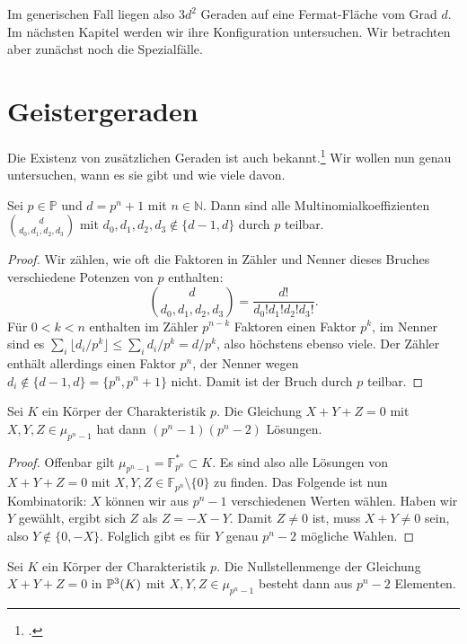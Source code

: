Im generischen Fall liegen also $3d^2$ Geraden auf eine Fermat-Fläche vom Grad $d$. Im nächsten Kapitel werden wir ihre Konfiguration untersuchen. Wir betrachten aber zunächst noch die Spezialfälle.

\section{Geistergeraden}
Die Existenz von zusätzlichen Geraden ist auch bekannt.\footcite[siehe][S.~14f]{LinesOnFermat} Wir wollen nun genau untersuchen, wann es sie gibt und wie viele davon.
\begin{prop}
Sei $p \in \mathbb P$ und $d = p^n+1$ mit $n \in \mathbb N$. Dann sind alle Multinomialkoeffizienten $\binom d{d_0,d_1,d_2,d_3}$ mit $d_0, d_1, d_2, d_3 \not\in \{d-1, d\}$ durch $p$ teilbar.
\end{prop}
\begin{proof}
Wir zählen, wie oft die Faktoren in Zähler und Nenner dieses Bruches verschiedene Potenzen von $p$ enthalten:
\begin{equation*}
\binom d{d_0,d_1,d_2,d_3} = \frac{d!}{d_0! d_1! d_2! d_3!}.
\end{equation*}
Für $0 < k < n$ enthalten im Zähler $p^{n-k}$ Faktoren einen Faktor $p^k$, im Nenner sind es $\sum_i \lfloor d_i/p^k \rfloor \leq \sum_i d_i/p^k = d/p^k$, also höchstens ebenso viele. Der Zähler enthält allerdings einen Faktor $p^n$, der Nenner wegen $d_i \not\in \{d-1, d\} = \{p^n, p^n+1\}$ nicht. Damit ist der Bruch durch $p$ teilbar.
\end{proof}

\begin{lemma}
Sei $K$ ein Körper der Charakteristik $p$. Die Gleichung $X+Y+Z=0$ mit $X,Y,Z \in \mu_{p^n-1}$ hat dann $(p^n-1)(p^n-2)$ Lösungen.
\end{lemma}
\begin{proof}
Offenbar gilt $\mu_{p^n-1} = \mathbb F_{p^n}^* \subset K$. Es sind also alle Lösungen von $X+Y+Z=0$ mit $X,Y,Z \in \mathbb F_{p^n} \setminus \{0\}$ zu finden. Das Folgende ist nun Kombinatorik: $X$ können wir aus $p^n-1$ verschiedenen Werten wählen. Haben wir $Y$ gewählt, ergibt sich $Z$ als $Z=-X-Y$. Damit $Z \neq 0$ ist, muss $X+Y \neq 0$ sein, also $Y \not\in \{0,-X\}$. Folglich gibt es für $Y$ genau $p^n-2$ mögliche Wahlen.
\end{proof}
\begin{coroll} \label{cor:projrootsum}
Sei $K$ ein Körper der Charakteristik $p$. Die Nullstellenmenge der Gleichung $X+Y+Z=0$ in $\mathbb P^{3}(K)$ mit $X,Y,Z \in \mu_{p^n-1}$ besteht dann aus $p^n-2$ Elementen.
\end{coroll}

